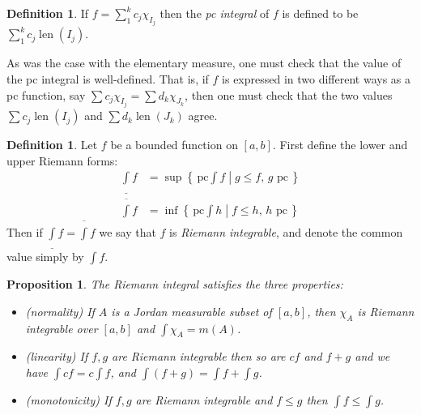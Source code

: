 \documentclass[11pt,oneside]{amsbook}
\newcommand{\set}[1]{\left\{\,#1\,\right\}}
\DeclareMathOperator{\len}{len}
\newcommand{\lint}{\underline\int}
\newcommand{\ovint}{\overline\int}
\theoremstyle{definition}
\theoremstyle{plain}
\newtheorem{prop}[thm]{Proposition}
\theoremstyle{definition}
\newtheorem{defn}[thm]{Definition}
\theoremstyle{remark}
\numberwithin{equation}{section}
\numberwithin{figure}{section}
\begin{document}
\begin{defn}
  If $f=\sum_1^kc_j\chi_{I_j}$ then the \emph{pc integral} of $f$ is defined to be $\sum_1^kc_j\len(I_j)$.
\end{defn}

As was the case with the elementary measure, one must check that the value of the pc integral is well-defined. That is, if $f$ is expressed in two different ways as a pc function, say $\sum c_j\chi_{I_j}=\sum d_k\chi_{J_k}$, then one must check that the two values $\sum c_j\len(I_j)$ and $\sum d_k\len(J_k)$ agree.

\begin{defn}
  Let $f$ be a bounded function on $[a,b]$. First define the lower and upper Riemann forms:
  \begin{align*}
    \lint f&=\sup\set{\left.\text{pc}\!\!\int\!\! f\;\right|\;g\leq f\text{, $g$ pc}}\\
    \ovint f&=\inf\set{\left.\text{pc}\!\!\int\!\! h\;\right|\;f\leq h\text{, $h$ pc}}
  \end{align*}
  Then if $\lint f=\ovint f$ we say that $f$ is \emph{Riemann integrable}, and denote the common value simply by $\int f$.
\end{defn}


\begin{prop}
  \label{prop:riemann-properties}
  The Riemann integral satisfies the three properties:
  \begin{itemize}
  \item (normality) If $A$ is a Jordan measurable subset of $[a,b]$, then $\chi_A$ is Riemann integrable over $[a,b]$ and $\int\chi_A=m(A)$.
  \item (linearity) If $f,g$ are Riemann integrable then so are $cf$ and $f+g$ and we have $\int cf=c\int f$, and $\int(f+g)=\int f+\int g$.
  \item (monotonicity) If $f,g$ are Riemann integrable and $f\leq g$ then $\int f\leq \int g$.
  \end{itemize}
\end{prop}
\end{document}
